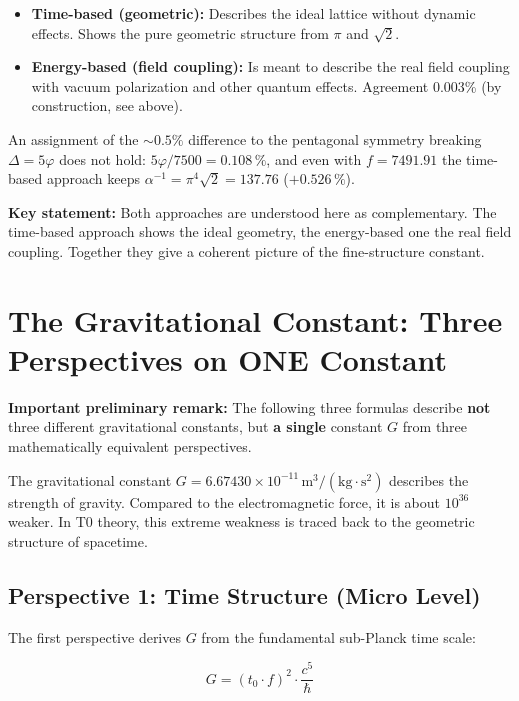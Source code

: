 	\begin{itemize}
		\item \textbf{Time-based (geometric):} Describes the ideal lattice without dynamic effects. Shows the pure geometric structure from \(\pi\) and \(\sqrt{2}\).
		
		\item \textbf{Energy-based (field coupling):} Is meant to describe the real field coupling with vacuum polarization and other quantum effects. Agreement 0.003\% (by construction, see above).
	\end{itemize}
	
	An assignment of the \(\sim0.5\%\) difference to the pentagonal symmetry breaking \(\Delta = 5\varphi\) does not hold: $5\varphi/7500 = 0.108\,\%$, and even with $f = 7491.91$ the time-based approach keeps $\alpha^{-1} = \pi^4\sqrt{2} = 137.76$ ($+0.526\,\%$).
	
	\textbf{Key statement:} Both approaches are understood here as complementary. The time-based approach shows the ideal geometry, the energy-based one the real field coupling. Together they give a coherent picture of the fine-structure constant.
	
	\section{The Gravitational Constant: Three Perspectives on ONE Constant}
	
	\textbf{Important preliminary remark:} The following three formulas describe \textbf{not} three different gravitational constants, but \textbf{a single} constant \(G\) from three mathematically equivalent perspectives.
	
	The gravitational constant \(G = 6.67430 \times 10^{-11}\,\text{m}^3/(\text{kg} \cdot \text{s}^2)\) describes the strength of gravity. Compared to the electromagnetic force, it is about \(10^{36}\) weaker. In T0 theory, this extreme weakness is traced back to the geometric structure of spacetime.
	
	\subsection{Perspective 1: Time Structure (Micro Level)}
	
	The first perspective derives \(G\) from the fundamental sub-Planck time scale:
	
	\begin{equation}
		\boxed{G = (t_0 \cdot f)^2 \cdot \frac{c^5}{\hbar}}
	\end{equation}
	
